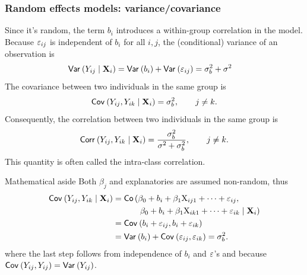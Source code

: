 \documentclass{beamer}
\begin{document}
\begin{frame}[fragile]
\frametitle{Random effects models: variance/covariance}

Since it's random, the term $b_i$ introduces a \alert{within-group correlation in the model}. Because $\varepsilon_{ij}$ is independent of $b_i$ for all $i, j$, the (conditional) variance of an observation is
\begin{align*}
{\mathsf{Var}_{}}\left(Y_{ij}\mid \mathbf{X}_i\right)&={\mathsf{Var}_{}}\left(b_i\right)+{\mathsf{Var}_{}}\left(\varepsilon_{ij}\right)=\sigma^2_b + \sigma^2_{\vphantom{b}}
\end{align*}
The covariance between two individuals in the same group is
\begin{align*}
{\mathsf{Cov}_{}}\left(Y_{ij}, Y_{ik}\mid \mathbf{X}_i\right)=\sigma^2_b, \qquad j\neq k.
\end{align*}
Consequently, the correlation between two individuals in the same group is
\begin{align*}
{\mathsf{Corr}_{}}\left(Y_{ij}, Y_{ik}\mid \mathbf{X}_i\right)=\frac{\sigma^2_b}{\sigma^2_{\vphantom{b}}+\sigma^2_b}, \qquad  j\neq k.
\end{align*}
This quantity is often called the \alert{intra-class correlation}.

\end{frame}
\begin{frame}{Mathematical aside}
Both  $\beta_j$ and explanatories are assumed non-random, thus
 \begin{align*}
  {\mathsf{Cov}_{}}\left(Y_{ij}, Y_{ik} \mid \mathbf{X}_i\right) &= \mathsf{Co}\left(\beta_0 +b_i + \beta_1\mathrm{X}_{ij1}+\cdots + \varepsilon_{ij},\right.\\
  & \quad \qquad \left.\beta_0 +b_i + \beta_1\mathrm{X}_{ik1}+\cdots + \varepsilon_{ik} \mid \mathbf{X}_i\right)
  \\&= {\mathsf{Cov}_{}}\left(b_i+ \varepsilon_{ij}, b_i + \varepsilon_{ik}\right)
  \\&= {\mathsf{Var}_{}}\left(b_i\right) + {\mathsf{Cov}_{}}\left(\varepsilon_{ij}, \varepsilon_{ik}\right) = \sigma^2_b.
\end{align*}
where the last step follows from independence of $b_i$ and $\varepsilon$'s and because ${\mathsf{Cov}_{}}\left(Y_{ij},Y_{ij}\right)={\mathsf{Var}_{}}\left(Y_{ij}\right)$.

\end{frame}
\end{document}
